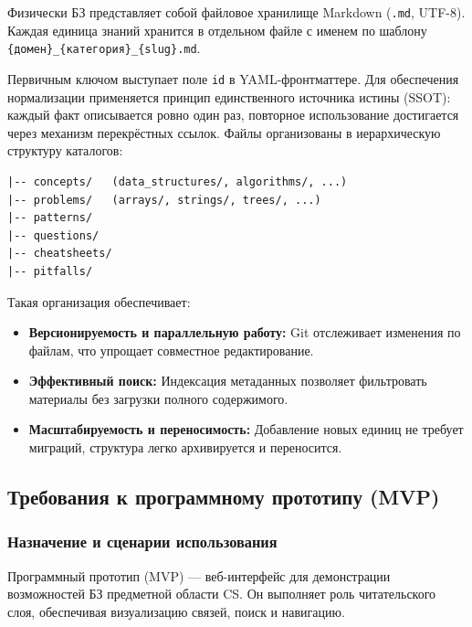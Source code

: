 
Физически БЗ представляет собой файловое хранилище Markdown (\texttt{.md}, UTF-8). Каждая единица знаний хранится в отдельном файле с именем по шаблону \texttt{\{домен\}\_\{категория\}\_\{slug\}.md}.

Первичным ключом выступает поле \texttt{id} в YAML-фронтматтере. Для обеспечения нормализации применяется принцип единственного источника истины (SSOT): каждый факт описывается ровно один раз, повторное использование достигается через механизм перекрёстных ссылок. Файлы организованы в иерархическую структуру каталогов:

\begin{verbatim}
|-- concepts/   (data_structures/, algorithms/, ...)
|-- problems/   (arrays/, strings/, trees/, ...)
|-- patterns/
|-- questions/
|-- cheatsheets/
|-- pitfalls/
\end{verbatim}

Такая организация обеспечивает:
\begin{itemize}
    \item \textbf{Версионируемость и параллельную работу:} Git отслеживает изменения по файлам, что упрощает совместное редактирование.
    \item \textbf{Эффективный поиск:} Индексация метаданных позволяет фильтровать материалы без загрузки полного содержимого.
    \item \textbf{Масштабируемость и переносимость:} Добавление новых единиц не требует миграций, структура легко архивируется и переносится.
\end{itemize}

\subsection{Требования к программному прототипу (MVP)}
\label{sec:mvp}

\subsubsection*{Назначение и сценарии использования}


Программный прототип (MVP) — веб-интерфейс для демонстрации возможностей БЗ предметной области CS. Он выполняет роль читательского слоя, обеспечивая визуализацию связей, поиск и навигацию.

